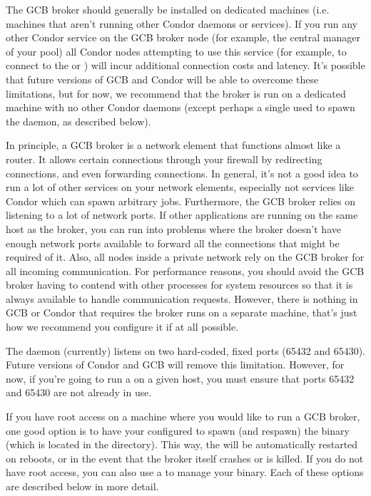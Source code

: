 The GCB broker should generally be installed on dedicated machines
(i.e. machines that aren't running other Condor daemons or services).
If you run any other Condor service on the GCB broker node (for
example, the central manager of your pool) all Condor nodes attempting
to use this service (for example, to connect to the 
or ) will incur additional connection costs and
latency.
It's possible that future versions of GCB and Condor will be able to
overcome these limitations, but for now, we recommend that the broker
is run on a dedicated machine with no other Condor daemons (except
perhaps a single  used to spawn the 
daemon, as described below).

In principle, a GCB broker is a network element that functions almost
like a router.
It allows certain connections through your firewall by redirecting
connections, and even forwarding connections.
In general, it's not a good idea to run a lot of other services on
your network elements, especially not services like Condor which can
spawn arbitrary jobs.
Furthermore, the GCB broker relies on listening to a lot of network
ports.
If other applications are running on the same host as the broker, you
can run into problems where the broker doesn't have enough network
ports available to forward all the connections that might be required
of it.
Also, all nodes inside a private network rely on the GCB broker for
all incoming communication.
For performance reasons, you should avoid the GCB broker having to
contend with other processes for system resources so that it is always
available to handle communication requests.
However, there is nothing in GCB or Condor that requires
the broker runs on a separate machine, that's just how we recommend
you configure it if at all possible.

The  daemon (currently) listens on two hard-coded,
fixed ports (65432 and 65430).
Future versions of Condor and GCB will remove this limitation.
However, for now, if you're going to run a  on a
given host, you must ensure that ports 65432 and 65430 are not already
in use. 

If you have root access on a machine where you would like to run a GCB
broker, one good option is to have your  configured to
spawn (and respawn) the  binary (which is located in
the  directory).
This way, the  will be automatically restarted on
reboots, or in the event that the broker itself crashes or is killed.
If you do not have root access, you can also use a  to
manage your  binary.  Each of these options are
described below in more detail.

